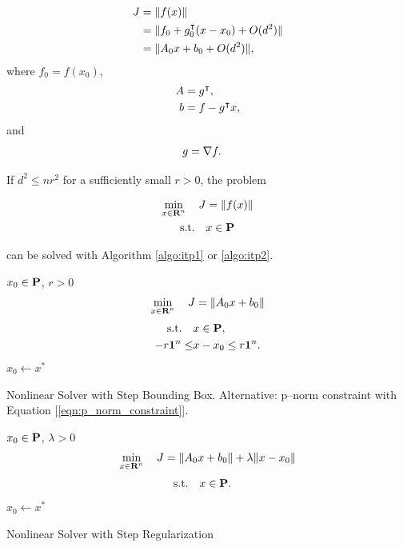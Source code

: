 \documentclass{article}
\begin{document}
    \begin{align*}
        J &= \|f(x)\|\\
        &= \|f_0+g_0^\intercal(x-x_0)+O(d^2)\|\\
        &= \|A_0x+b_0+O(d^2)\|,
    \end{align*}
    where $f_0=f(x_0)$,
    \begin{align*}
        A&= g^\intercal,\\
        b&=f-g^\intercal x,
    \end{align*}
    and
    \begin{align*}
        g&=\nabla f.
    \end{align*}

    If $d^2\leq nr^2$ for a sufficiently small $r>0$, the problem

    \begin{align*}
        \min_{x\in\textbf{R}^n}\quad J &= \|f(x)\|\\
        \text{s.t.} \quad &x\in\textbf{P}
    \end{align*}

    can be solved with Algorithm \ref{algo:itp1} or \ref{algo:itp2}. 

    \begin{algorithm}[H]
        \SetAlgoLined
        $x_0 \in\textbf{P}$, $r>0$\\
        {
            \begin{align*}
                \min_{x\in\textbf{R}^n}\quad J = \|A_0x+b_0\|
            \end{align*}
            \begin{align*}
                \text{s.t.} \quad &x\in\textbf{P},\\
                -r\textbf{1}^n\leq&x-x_0\leq r\textbf{1}^n.
            \end{align*}
            $x_0\leftarrow x^*$
        }
    \caption{Nonlinear Solver with Step Bounding Box.
    Alternative: p--norm constraint with Equation [\ref{eqn:p_norm_constraint}].}
    \label{algo:itp1}
    \end{algorithm}
    \begin{algorithm}[H]
        \SetAlgoLined
        $x_0 \in\textbf{P}$, $\lambda>0$\\
        {
            \begin{align*}
                \min_{x\in\textbf{R}^n}\quad J = \|A_0x+b_0\|+\lambda\|x-x_0\|
            \end{align*}
            \begin{align*}
                \text{s.t.} \quad &x\in\textbf{P}.
            \end{align*}
            $x_0\leftarrow x^*$
        }
    \caption{Nonlinear Solver with Step Regularization}
    \label{algo:itp2}
    \end{algorithm}
\end{document}
